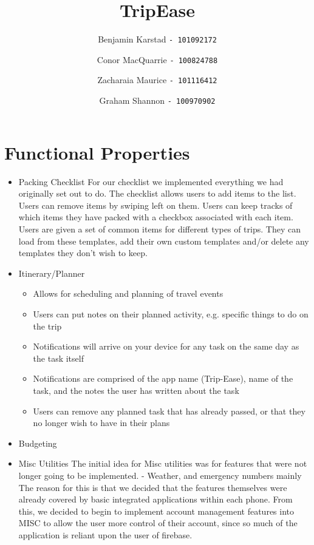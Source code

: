 \documentclass[12pt]{article}
\title{TripEase}
\author{
Benjamin Karstad
\texttt{- 101092172}
\and
Conor MacQuarrie
\texttt{- 100824788}
\and
Zacharaia Maurice
\texttt{- 101116412}
\and
Graham Shannon
\texttt{- 100970902}
}
\begin{document}
	\maketitle

	\section*{Functional Properties}

	\begin{itemize}

		\item{Packing Checklist}
		For our checklist we implemented everything we had originally set out to do.
		The checklist allows users to add items to the list. Users can remove items by swiping left on them.
		Users can keep tracks of which items they have packed with a checkbox associated with each item. Users are given a set of common items for different types of trips.
		They can load from these templates, add their own custom templates and/or delete any templates they don't wish to keep.

		\item{Itinerary/Planner}
			\begin{itemize}
				\item Allows for scheduling and planning of travel events
				\item Users can put notes on their planned activity, e.g. specific things to do on the trip
				\item Notifications will arrive on your device for any task on the same day as the task itself
				\item Notifications are comprised of the app name (Trip-Ease), name of the task, and the notes the user has written about the task
				\item Users can remove any planned task that has already passed, or that they no longer wish to have in their plans
			\end{itemize}
		\item{Budgeting}

		\item{Misc Utilities}
		The initial idea for Misc utilities was for features that were not longer going to be implemented.
		- Weather, and emergency numbers mainly
		The reason for this is that we decided that the features themselves were already covered by basic integrated applications within each phone.
		From this, we decided to begin to implement account management features into MISC to allow the user more control of their account, since so much of the
		application is reliant upon the user of firebase.




\end{itemize}
\end{document}
